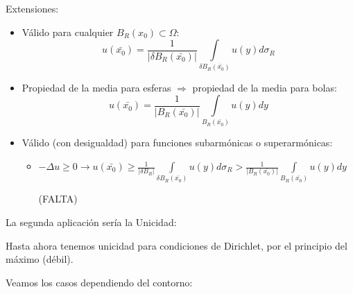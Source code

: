 		Extensiones:
		\begin{itemize}
			\item Válido para cualquier $B_R(x_0) \subset \Omega$:
			\[ u(\bar{x_0}) = \frac{1}{|\delta B_R(\bar{x_0})|} \int\limits_{\delta B_R(\bar{x_0})} u(y)d\sigma_R \]

			\item Propiedad de la media para esferas $\Rightarrow$ propiedad de la media para bolas:
			\[ u(\bar{x_0}) = \frac{1}{|B_R(\bar{x_0})|} \int\limits_{B_R(\bar{x_0})} u(y)dy \]

			\item Válido (con desigualdad) para funciones subarmónicas o superarmónicas:
			\begin{itemize}
				\item $-\Delta u \geq 0 \rightarrow u(\bar{x_0}) \geq \frac{1}{|\delta B_R|} \int\limits_{\delta B_R(\bar{x_0})} u(y)d\sigma_R > \frac{1}{|B_R(\bar{x_0})|} \int\limits_{B_R(\bar{x_0})} u(y)dy$

				(FALTA)
			\end{itemize}
		\end{itemize}

		La segunda aplicación sería la Unicidad:

		\obs Hasta ahora tenemos unicidad para condiciones de Dirichlet, por el principio del máximo (débil).

		Veamos los casos dependiendo del contorno:

